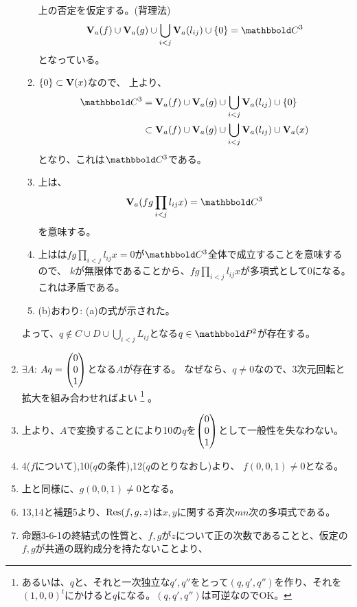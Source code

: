 \begin{myproof}
\begin{enumerate}
\begin{enumerate}
      上の否定を仮定する。(背理法)
      \begin{align}
        \var_a(f) \cup \var_a(g) \cup \bigcup_{i<j}\var_a(l_{ij}) \cup \zeroset = \C^3
      \end{align}
      となっている。
      \item
      $\{0\} \subset \textbf V(x)$なので、
      上より、
      \begin{align}
        \C^3
        &=
        \var_a(f) \cup \var_a(g) \cup \bigcup_{i<j}\var_a(l_{ij}) \cup \zeroset \\
        &\subset
        \var_a(f) \cup \var_a(g) \cup \bigcup_{i<j}\var_a(l_{ij}) \cup \var_a(x)
      \end{align}
      となり、これは$\C^3$である。
      \item
      上は、
      \begin{align}
        \var_a(fg \prod_{i<j}l_{ij} x) = \C^3
      \end{align}
      を意味する。
      \item
      上はは$fg \prod_{i<j}l_{ij}x = 0$が$\C^3$全体で成立することを意味するので、
      $k$が無限体であることから、$fg \prod_{i<j}l_{ij}x$が多項式として0になる。これは矛盾である。
      \item
      (b)おわり: (a)の式が示された。
    \end{enumerate}
    よって、$q \notin C\cup D \cup \bigcup_{i<j}L_{ij}$となる$q\in \P^2$が存在する。
    \item $\exists A$:
    $Aq = \left(\begin{matrix} 0 \\ 0 \\ 1 \end{matrix}\right)$となる$A$が存在する。
    なぜなら、$q\neq 0$なので、3次元回転と拡大を組み合わせればよい
    \footnote{あるいは、$q$と、それと一次独立な$q',q''$をとって$(q,q',q'')$を作り、それを$(1,0,0)^t$にかけると$q$になる。$(q,q',q'')$は可逆なのでOK。}
    。
    \item
    上より、$A$で変換することにより10の$q$を$\left(\begin{matrix} 0 \\ 0\\ 1 \end{matrix}\right)$として一般性を失なわない。
    \item
    4($f$について),10($q$の条件),12($q$のとりなおし)より、
    $f(0,0,1)\neq 0$となる。
    \item
    上と同様に、$g(0,0,1)\neq 0$となる。
    \item
    13,14と補題5より、$\mathrm{Res}(f,g,z)$は$x,y$に関する斉次$mn$次の多項式である。
    \item
    命題3-6-1の終結式の性質と、$f,g$が$z$について正の次数であることと、仮定の$f,g$が共通の既約成分を持たないことより、

\end{enumerate}
\end{myproof}
